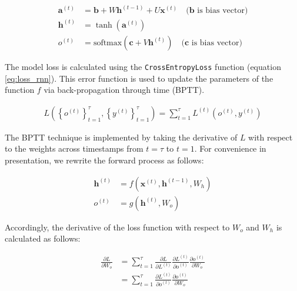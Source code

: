 \begin{align}
    \mathbf{a}^{(t)} &= \mathbf{b} + W\mathbf{h}^{(t-1)} + U\mathbf{x}^{(t)} \quad \text{($\mathbf{b}$ is bias vector)}\\
    \mathbf{h}^{(t)} &= \tanh\left( \mathbf{a}^{(t)} \right)\\
    o^{(t)} &= \text{softmax}\left( \mathbf{c} + V\mathbf{h}^{(t)} \right) \quad \text{($\mathbf{c}$ is bias vector)}
\end{align}


The model loss is calculated using the \verb|CrossEntropyLoss| function (equation \ref{eq:loss_rnn}). This error function is used to update the parameters of the function $f$ via back-propagation through time (BPTT).

\begin{align}
    L\left( \left\{ o^{(t)} \right\}_{t=1}^\tau, \left\{ y^{(t)} \right\}_{t=1}^\tau \right) = \sum_{t=1}^\tau{L^{(t)}\left( o^{(t)}, y^{(t)} \right)}
    \label{eq:loss_rnn}
\end{align}


The BPTT technique is implemented by taking the derivative of $L$ with respect to the weights across timestamps from $t=\tau$ to $t=1$. For convenience in presentation, we rewrite the forward process as follows:

\begin{align}
    \mathbf{h}^{(t)} &= f\left( \mathbf{x}^{(t)}, \mathbf{h}^{(t-1)}, W_h \right)\\
    o^{(t)} &= g\left( \mathbf{h}^{(t)}, W_o \right)
\end{align}

Accordingly, the derivative of the loss function with respect to $W_o$ and $W_h$ is calculated as follows:

\begin{align}
    \frac{\partial L}{\partial W_o} &= \sum_{t=1}^\tau{\frac{\partial L}{\partial L^{(t)}} \frac{\partial L^{(t)}}{\partial o^{(t)}} \frac{\partial o^{(t)}}{\partial W_o}}\\
    &= \sum_{t=1}^\tau{\frac{\partial L^{(t)}}{\partial o^{(t)}} \frac{\partial o^{(t)}}{\partial W_o}}
    \label{eq:grad_wo}
\end{align}

